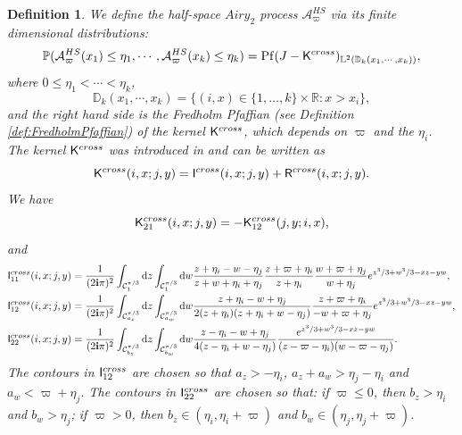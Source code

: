 \documentclass[12pt,a4paper]{amsart}
\newtheorem{definition}[theorem]{Definition}
\theoremstyle{remark}
\numberwithin{equation}{section} \numberwithin{theorem}{section}
\newcommand{\Pf}{\ensuremath{\mathrm{Pf}}}
\newcommand{\kernel}{\mathsf{K}}
\newcommand{\Ikernel}{\mathsf{I}}
\newcommand{\Rkernel}{\mathsf{R}}
\newcommand{\I}{\ensuremath{\mathbf{i}}}
\begin{document}
\begin{definition}
We define the \emph{half-space ${Airy}_2$ process}
$\mathcal{A}_{\varpi}^{HS}$ via its finite dimensional distributions:
\begin{align}
\mathbb{P}(\mathcal{A}_{\varpi}^{HS}(x_1) \leq \eta_1, \cdots, \mathcal{A}_{\varpi}^{HS}(x_k) \leq \eta_k )= \Pf(J - \kernel^{\rm cross})_{\mathbb{L}^2(\mathbb{D}_k(x_1, \cdots, x_k))},
\end{align}
where $0\leq \eta_1<\cdots<\eta_k$,
\[
\mathbb{D}_k(x_1,\cdots,x_k)
=
\big\{(i,x)\in\{1,\ldots,k\}\times\mathbb{R}:x>x_i\big\},
\]
and the right hand side is the Fredholm Pfaffian
(see Definition \ref{def:FredholmPfaffian}) of the kernel
$\kernel^{\rm cross}$, which depends on $\varpi$ and the $\eta_i$.
The kernel $\kernel^{\rm cross}$ was introduced in
\cite[Section 2.5]{BBCS18a} and can be written as
$$
\kernel^{\rm cross}(i,x;j,y)
=
\Ikernel^{\rm cross}(i,x;j,y)
+
\Rkernel^{\rm cross}(i,x;j,y).
$$
We have
\[
\kernel_{21}^{\rm cross}(i,x;j,y)
=
-\kernel_{12}^{\rm cross}(j,y;i,x),
\]
and
\begin{align*}
\Ikernel_{11}^{\rm cross}(i,x;j,y)
={}&
\frac{1}{(2\I\pi)^2}
\int_{\mathcal{C}_{1}^{\pi/3}}\mathrm{d}z
\int_{\mathcal{C}_{1}^{\pi/3}}\mathrm{d}w
\frac{z+\eta_i-w-\eta_j}{z+w+\eta_i+\eta_j}
\frac{z+\varpi+\eta_i}{z+\eta_i}
\frac{w+\varpi+\eta_j}{w+\eta_j}
e^{z^3/3+w^3/3-xz-yw},
\\
\Ikernel_{12}^{\rm cross}(i,x;j,y)
={}&
\frac{1}{(2\I\pi)^2}
\int_{\mathcal{C}_{a_z}^{\pi/3}}\mathrm{d}z
\int_{\mathcal{C}_{a_w}^{\pi/3}}\mathrm{d}w
\frac{z+\eta_i-w+\eta_j}
{2(z+\eta_i)(z+\eta_i+w-\eta_j)}
\frac{z+\varpi+\eta_i}{-w+\varpi+\eta_j}
e^{z^3/3+w^3/3-xz-yw},
\\
\Ikernel_{22}^{\rm cross}(i,x;j,y)
={}&
\frac{1}{(2\I\pi)^2}
\int_{\mathcal{C}_{b_z}^{\pi/3}}\mathrm{d}z
\int_{\mathcal{C}_{b_w}^{\pi/3}}\mathrm{d}w
\frac{z-\eta_i-w+\eta_j}
{4(z-\eta_i+w-\eta_j)}
\frac{e^{z^3/3+w^3/3-xz-yw}}
{(z-\varpi-\eta_i)(w-\varpi-\eta_j)}.
\end{align*}
The contours in $\Ikernel_{12}^{\rm cross}$ are chosen so that
$a_z>-\eta_i$, $a_z+a_w>\eta_j-\eta_i$ and
$a_w<\varpi+\eta_j$.
The contours in $\Ikernel_{22}^{\rm cross}$ are chosen so that:
if $\varpi\leq 0$, then $b_z>\eta_i$ and $b_w>\eta_j$; if
$\varpi>0$, then
$b_z\in(\eta_i,\eta_i+\varpi)$ and
$b_w\in(\eta_j,\eta_j+\varpi)$.


\end{definition}
\end{document}
